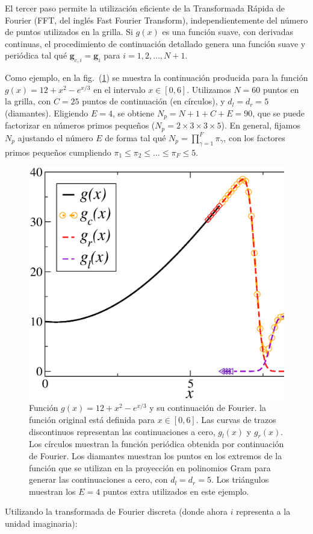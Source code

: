 El tercer paso permite la utilización eficiente de la Transformada Rápida de Fourier
(FFT, del inglés Fast Fourier Transform), independientemente del número de puntos 
utilizados en la grilla.  
Si $g(x)$ es una función suave, con derivadas continuas, el 
procedimiento de continuación detallado genera una función suave 
y periódica tal qué $\mathbf{g}_{c,i}=\mathbf{g}_i$ para $i=1,2,\ldots,N+1$.

Como ejemplo, en la fig.~(\ref{fig:Continuedg}) se muestra la continuación 
producida para la función $g(x)=12+x^2 - e^{x/3}$ en el intervalo $x\in [0,6]$.
Utilizamos $N=60$ puntos en la grilla, con $C=25$ puntos de continuación (en círculos), 
y $d_l=d_r=5$ (diamantes). Eligiendo $E=4$, se obtiene  $N_p = N + 1 + C + E=90$, 
que se puede factorizar en números primos pequeños ($N_p=2\times 3 \times 3 \times 5$). 
En general, fijamos $N_p$ ajustando el número $E$ de forma tal 
qué $N_p=\prod_{\gamma=1}^{F} \pi_{\gamma}$, con los factores 
primos pequeños cumpliendo $\pi_1\leq\pi_2\leq \ldots \leq \pi_{F} \leq 5$. 

\begin{figure}[h!]
\centering
  \includegraphics[width=0.5\linewidth]{figuras/continued.eps}
  \caption{Función $g(x)=12+x^2 - e^{x/3}$ y su continuación de Fourier. 
  la función original está definida para $x\in[0,6]$. Las curvas 
  de trazos discontinuos representan las continuaciones a cero, $g_l(x)$ y $g_r(x)$.
  Los círculos muestran la función periódica obtenida por continuación de Fourier. 
  Los diamantes muestran los puntos en los extremos de la función 
  que se utilizan en la proyección en polinomios Gram para generar las continuaciones 
  a cero, con $d_l=d_r=5$. Los triángulos muestran los $E=4$ puntos 
  extra utilizados en este ejemplo.}
 \label{fig:Continuedg}
\end{figure}

Utilizando la transformada de Fourier discreta (donde ahora $i$ representa a la unidad imaginaria):

